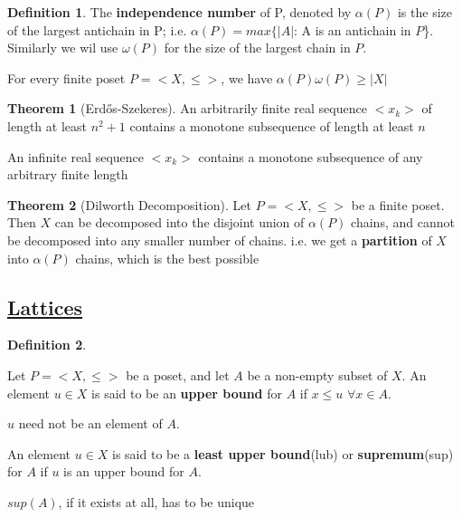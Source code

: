\documentclass{article}
\theoremstyle{definition}
\newtheorem*{defi}{Definition}
\theoremstyle{definition}
\newenvironment{manualprop}[1]{%
  \renewcommand\themanualpropinner{#1}%
  \manualpropinner
}{\endmanualpropinner}
\newenvironment{manualcoro}[1]{%
  \renewcommand\themanualcoroinner{#1}%
  \manualcoroinner
}{\endmanualcoroinner}
\theoremstyle{named}
\newtheorem*{namedtheorem}{Theorem}
\begin{document}
\begin{defi}
The \textbf{independence number} of P, denoted by $\alpha(P)$ is the size of the largest antichain in P; \newline i.e.  $\alpha(P) = max\{|A|$: A is an antichain in $P$\}.
\newline
Similarly we wil use $\omega(P)$ for the size of the largest chain in $P$.
\end{defi}

\begin{manualprop}{8}[important]
For every finite poset $P = <X, \leq>$, we have $\alpha(P)\omega(P) \geq |X|$
\end{manualprop}

\begin{namedtheorem}[Erdős-Szekeres] 
An arbitrarily finite real sequence $<x_k>$ of length at least $n^2 + 1$ contains a monotone subsequence of length at least $n$
\end{namedtheorem}

\begin{manualcoro}{1.1}
An infinite real sequence $<x_k>$ contains a monotone subsequence of any arbitrary finite length
\end{manualcoro}

\begin{namedtheorem}[Dilworth Decomposition]
Let $P = <X, \le>$ be a finite poset. Then $X$ can be decomposed into the disjoint union of $\alpha(P)$ chains, and cannot be decomposed into any smaller number of chains. i.e. we get a \textbf{partition} of $X$ into $\alpha(P)$ chains, which is the best possible 
\end{namedtheorem}

\subsection{\underline{Lattices}}

\begin{defi}

\begin{citemize}
    
\item Let $P = <X, \leq>$ be a poset, and let $A$ be a non-empty subset of $X$. An element $u \in X$ is said to be an \textbf{upper bound} for $A$ if $x \leq u$ $\forall x \in A$.
\item $u$ need not be an element of $A$. 
\item An element $u\in X$ is said to be a \textbf{least upper bound}(lub) or \textbf{supremum}(sup) for $A$ if $u$ is an upper bound for $A$.
\item $sup(A)$, if it exists at all, has to be unique
\end{citemize}
\end{defi}
\end{document}
